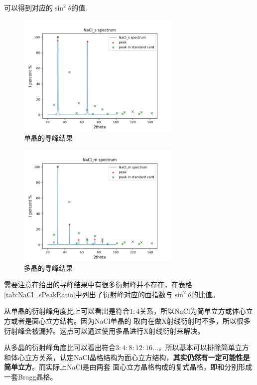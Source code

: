 \documentclass[10pt]{ctexart}
\begin{document}
可以得到对应的$\sin^2{\theta}$的值.
\begin{figure}
    \centering
    \includegraphics[width=0.7\textwidth]{data/NaCl_s/spectrum.png}
    \caption{单晶的寻峰结果}
    \label{fig:NaClSJadespec}
\end{figure}
\begin{figure}
    \centering
    \includegraphics[width=0.7\textwidth]{data/NaCl_m/spectrum.png}
    \caption{多晶的寻峰结果}
    \label{fig:NaClMJadespec}
\end{figure}
需要注意在给出的寻峰结果中有很多衍射峰并不存在，在表格\ref{tab:NaCl_sPeakRatio}中列出了衍射峰对应的面指数与$\sin^2{\theta}$的比值。

从单晶的衍射峰角度比上可以看出是符合$1:4$关系，所以NaCl为简单立方或体心立方或者是面心立方结构。因为NaCl单晶的
取向在做X射线衍射时不多，所以很多衍射峰会被漏掉。这点可以通过使用多晶进行X射线衍射来解决。

从多晶的衍射峰角度比可以看出符合$3:4:8:12:16...$，所以基本可以排除简单立方和体心立方关系，认定NaCl晶格结构为面心立方结构，\textbf{其实仍然有一定可能性是简单立方}。而实际上NaCl是由两套
面心立方晶格构成的复式晶格，即和分别形成一套Bragg晶格。\cite{gutiPhys}
\end{document}

